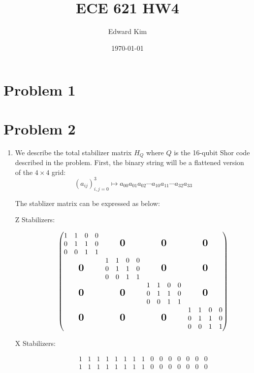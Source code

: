 \documentclass[12pt]{article}%
\newcommand{\bigzero}{\mbox{\normalfont\Large\bfseries 0}}
\begin{document}
\title{ECE 621 HW4}
\author{Edward Kim}
\date{\today}
\maketitle


\section*{Problem 1}

\section*{Problem 2}
\begin{enumerate}
	\item We describe the total stabilizer matrix $H_Q$ where $Q$ is the 16-qubit Shor code described in the problem. First, the binary string will be a flattened version of the $4 \times 4$ grid:
		 \[ (a_{ij})_{i,j = 0}^3 \mapsto a_{00}a_{01}a_{02} \cdots a_{10}a_{11} \cdots a_{32}a_{33} \]

	The stablizer matrix can be expressed as below:

	\begin{description}
		\item[Z Stabilizers:]
	\[
	\begin{pmatrix} 
	
	  \begin{matrix}
			1& 1 & 0 & 0 \\
			0 & 1 & 1& 0 \\
			0 & 0 & 1 & 1
 		 \end{matrix}
		 & \bigzero & \bigzero & \bigzero \\
		\bigzero & 
	  \begin{matrix}
			1& 1 & 0 & 0 \\
			0 & 1 & 1& 0 \\
			0 & 0 & 1 & 1
 		 \end{matrix}
		  & \bigzero & \bigzero \\
		\bigzero & \bigzero & 
	  \begin{matrix}
			1& 1 & 0 & 0 \\
			0 & 1 & 1& 0 \\
			0 & 0 & 1 & 1
 		 \end{matrix}  & \bigzero \\

		\bigzero & \bigzero & \bigzero & 
	  \begin{matrix}
			1& 1 & 0 & 0 \\
			0 & 1 & 1& 0 \\
			0 & 0 & 1 & 1
 		 \end{matrix}
	\end{pmatrix}
	\]
\item[X Stabilizers:]
	\[
	\begin{matrix}
	1 & 1 & 1 & 1 & 1 & 1 & 1 & 1 & 0 & 0 & 0 & 0 & 0 & 0 & 0 \\
	1 & 1 & 1 & 1 & 1 & 1 & 1 & 1 & 0 & 0 & 0 & 0 & 0 & 0 & 0 
	\end{matrix}
	\]
	\end{description}
\end{enumerate}
\end{document}
